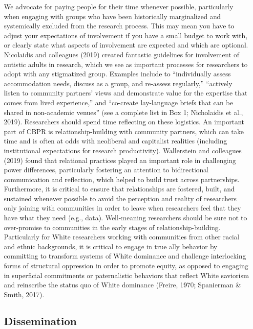 \documentclass[
  11pt,
]{book}
\begin{document}
We advocate for paying people for their time whenever possible, particularly when engaging with groups who have been historically marginalized and systemically excluded from the research process. This may mean you have to adjust your expectations of involvement if you have a small budget to work with, or clearly state what aspects of involvement are expected and which are optional. Nicolaidis and colleagues (2019) created fantastic guidelines for involvement of autistic adults in research, which we see as important processes for researchers to adopt with any stigmatized group. Examples include to ``individually assess accommodation needs, discuss as a group, and re-assess regularly,'' ``actively listen to community partners' views and demonstrate value for the expertise that comes from lived experience,'' and ``co-create lay-language briefs that can be shared in non-academic venues'' (see a complete list in Box 1; Nicholaidis et al., 2019). Researchers should spend time reflecting on these logistics. An important part of CBPR is relationship-building with community partners, which can take time and is often at odds with neoliberal and capitalist realities (including institutional expectations for research productivity). Wallerstein and colleagues (2019) found that relational practices played an important role in challenging power differences, particularly fostering an attention to bidirectional communication and reflection, which helped to build trust across partnerships. Furthermore, it is critical to ensure that relationships are fostered, built, and sustained whenever possible to avoid the perception and reality of researchers only joining with communities in order to leave when researchers feel that they have what they need (e.g., data). Well-meaning researchers should be sure not to over-promise to communities in the early stages of relationship-building. Particularly for White researchers working with communities from other racial and ethnic backgrounds, it is critical to engage in true ally behavior by committing to transform systems of White dominance and challenge interlocking forms of structural oppression in order to promote equity, as opposed to engaging in superficial commitments or paternalistic behaviors that reflect White saviorism and reinscribe the status quo of White dominance (Freire, 1970; Spanierman \& Smith, 2017).

\hypertarget{dissemination}{%
\subsection{Dissemination}\label{dissemination}}
\end{document}

